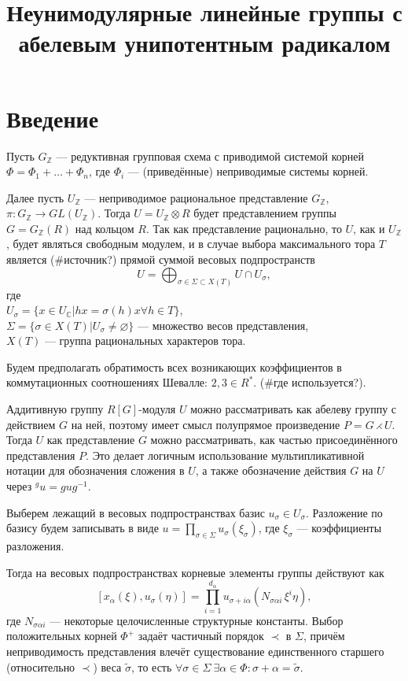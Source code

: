 \documentclass[15pt]{article}
\title{Неунимодулярные линейные группы с абелевым унипотентным радикалом}
\author{}
\date{}
\theoremstyle{remark}
\newcommand{\Z}{\mathbb{Z}}
\renewcommand{\C}{\mathbb{C}}
\begin{document}
\maketitle

\sloppy

\section{Введение}

Пусть $G_\Z$ --- редуктивная групповая схема с приводимой системой корней $\Phi = \Phi_1 + \dots + \Phi_n$, где $\Phi_i$ --- (приведённые) неприводимые системы корней.

Далее пусть $U_\Z$ --- неприводимое рациональное представление $G_\Z$, $\pi:G_\Z \to GL(U_\Z)$. Тогда $U=U_\Z\otimes R$ будет представлением группы $G=G_\Z(R)$ над кольцом $R$. Так как представление рационально, то $U$, как и $U_\Z$, будет являться свободным модулем, и в случае выбора максимального тора $T$ является (\#источник?) прямой суммой весовых подпространств
$$U=\bigoplus_{\sigma \in \Sigma \subset X(T)} {U \cap U_\sigma} ,$$
где\\
$U_\sigma = \{x \in U_\C | h x = \sigma(h) x \forall h \in T \}$,\\
$\Sigma = \{\sigma \in X(T) | U_\sigma \ne \varnothing\}$ --- множество весов представления,\\
$X(T)$ --- группа рациональных характеров тора.

Будем предполагать обратимость всех возникающих коэффициентов в коммутационных соотношениях Шевалле: $2,3 \in R^* $.
(\#где используется?).

Аддитивную группу $R[G]$-модуля $U$ можно рассматривать как абелеву группу с действием $G$ на ней, поэтому
имеет смысл полупрямое произведение $P = G \rightthreetimes U$.
Тогда $U$ как представление $G$ можно рассматривать, как частью присоединённого представления $P$. Это делает логичным использование мультипликативной нотации для обозначения сложения в $U$, а также обозначение действия $G$ на $U$ через $^{g}u = g u g^{-1}$. 

Выберем лежащий в весовых подпространствах базис $u_\sigma \in U_\sigma$. Разложение по базису будем записывать в виде $u = \prod_{\sigma \in \Sigma} u_\sigma(\xi_\sigma)$, где $\xi_\sigma$ --- коэффициенты разложения.

Тогда на весовых подпространствах корневые элементы группы действуют как
\begin{equation}\label{eq:commutator_relation}
[x_\alpha(\xi), u_\sigma(\eta)] = \prod_{i=1}^{d_\alpha} u_{\sigma+i\alpha}(N_{\sigma\alpha i}\,\xi^i \eta),
\end{equation}
где $N_{\sigma\alpha i}$ ---  некоторые целочисленные структурные константы. Выбор положительных корней $\Phi^+$ задаёт частичный порядок $\prec$ в $\Sigma$, причём неприводимость представления влечёт существование единственного старшего (относительно $\prec$) веса $\widetilde{\sigma}$, то есть $\forall \sigma \in \Sigma \  \exists \alpha \in \Phi : \sigma+\alpha = \widetilde{\sigma}$.
\end{document}
